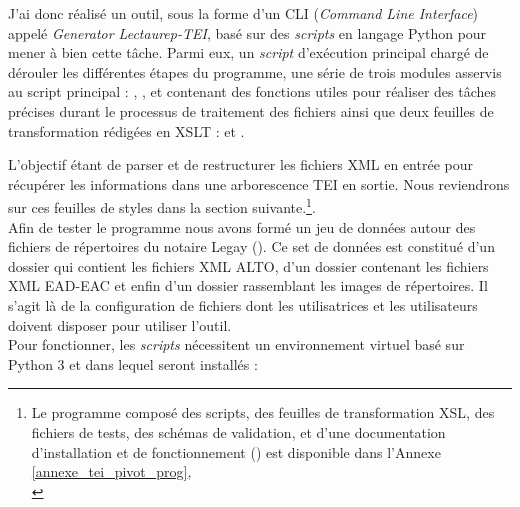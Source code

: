 J'ai donc réalisé un outil, sous la forme d'un CLI (\textit{Command Line Interface}) appelé \textit{Generator Lectaurep-TEI}, basé sur des \textit{scripts} en langage Python pour mener à bien cette tâche. Parmi eux, un \textit{script} d'exécution principal  chargé de dérouler les différentes étapes du programme, une série de trois modules asservis au script principal : , , et  contenant des fonctions utiles pour réaliser des tâches précises durant le processus de traitement des fichiers ainsi que deux feuilles de transformation rédigées en XSLT :  et .

L'objectif étant de parser et de restructurer les fichiers XML en entrée pour récupérer les informations dans une arborescence TEI en sortie. Nous reviendrons sur ces feuilles de styles dans la section suivante.\footnote{Le programme composé des scripts, des feuilles de transformation XSL, des fichiers de tests, des schémas de validation, et d'une documentation d'installation et de fonctionnement  () est disponible dans l'Annexe \ref{annexe_tei_pivot_prog}, \\
}.\\

Afin de tester le programme nous avons formé un jeu de données autour des fichiers de répertoires du notaire Legay (). Ce set de données est constitué d'un dossier  qui contient les fichiers XML ALTO, d'un dossier  contenant les fichiers XML EAD-EAC et enfin d'un dossier  rassemblant les images de répertoires. Il s'agit là de la configuration de fichiers dont les utilisatrices et les utilisateurs doivent disposer pour utiliser l'outil.\\
\newpage
Pour fonctionner, les \textit{scripts} nécessitent un environnement virtuel basé sur Python 3 et dans lequel seront installés :

